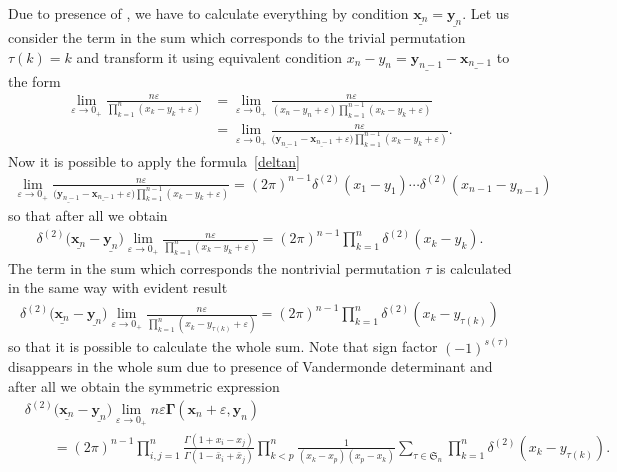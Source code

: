 \documentclass[10pt,a4paper]{amsart}
\numberwithin{equation}{section}
\begin{document}
Due to presence of , we have to
calculate everything by condition $\underline{\bm{x}_n}=\underline{\bm{y}_n}$.
Let us consider the term in the sum which corresponds to the trivial permutation $\tau(k) = k$ and transform it using equivalent condition
$x_n-y_n = \underline{\bm{y}_{n-1}}-\underline{\bm{x}_{n-1}}$ to the form
\begin{align*}
\lim_{\varepsilon\to 0_+}
\frac{n \varepsilon}{\prod_{k=1}^{n}(x_k-y_{k}+\varepsilon)} & =
\lim_{\varepsilon\to 0_+}
\frac{n \varepsilon}{(x_n-y_{n}+\varepsilon)
\prod_{k=1}^{n-1}(x_k-y_k+\varepsilon)} \\
& =
\lim_{\varepsilon\to 0_+}
\frac{n \varepsilon}
{\bigl(\underline{\bm{y}_{n-1}}-\underline{\bm{x}_{n-1}}+\varepsilon\bigr)
\prod_{k=1}^{n-1}(x_k-y_k+\varepsilon)} .
\end{align*}
Now it is possible to apply the formula~\eqref{deltan}
\begin{align*}
\lim\limits_{\varepsilon\to 0_+}
\frac{n \varepsilon}
{\bigl(\underline{\bm{y}_{n-1}}-\underline{\bm{x}_{n-1}}+\varepsilon\bigr)
\prod_{k=1}^{n-1}(x_k-y_k+\varepsilon)} =
(2\pi)^{n-1} \delta^{(2)}(x_1-y_1) \cdots \delta^{(2)}(x_{n-1}-y_{n-1})
\end{align*}
so that after all we obtain
\begin{align*}
\delta^{(2)}\bigl(\underline{\bm{x}_n}-\underline{\bm{y}_n}\bigr)
\lim\limits_{\varepsilon\to 0_+}
\frac{n \varepsilon}
{\prod_{k=1}^{n}(x_k-y_k+\varepsilon)} =
(2\pi)^{n-1} \prod_{k=1}^{n}
\delta^{(2)}(x_k-y_k) .
\end{align*}
The term in the sum which corresponds the nontrivial
permutation $\tau$ is calculated in the same way with evident result
\begin{align*}
\delta^{(2)}\bigl(\underline{\bm{x}_n}-\underline{\bm{y}_n}\bigr)
\lim\limits_{\varepsilon\to 0_+}
\frac{n \varepsilon}
{\prod_{k=1}^{n}(x_k-y_{\tau(k)}+\varepsilon)} =
(2\pi)^{n-1} \prod_{k=1}^{n}
\delta^{(2)}(x_k-y_{\tau(k)})
\end{align*}
so that it is possible to calculate the whole sum.
Note that sign factor $(-1)^{s(\tau)}$ disappears in the whole sum
due to presence of Vandermonde determinant
 and after all we obtain the
symmetric expression
\begin{align*}
&
\delta^{(2)}\bigl(\underline{\bm{x}_n}-\underline{\bm{y}_n}\bigr)
\lim_{\varepsilon\to 0_+}
n \varepsilon \mathbf{\Gamma}(\bm{x}_n+\varepsilon, \bm{y}_n) \\
& \qquad =
(2\pi)^{n-1} \prod\limits_{i,j=1}^n
\frac{\Gamma(1+x_i-x_j)}{\Gamma(1 -\bar{x}_i+\bar{x}_j)}
\prod\limits_{k<p}^n \frac{1}
{(x_{k}-x_{p}) (x_{p}-x_{k})}
\sum_{\tau\in \mathfrak{S}_{n}} \prod_{k=1}^{n}
\delta^{(2)}(x_k-y_{\tau(k)}) .
\end{align*}
\end{document}
